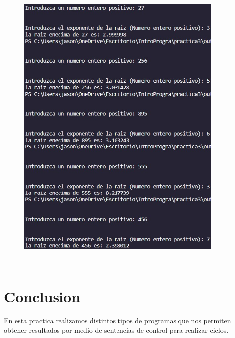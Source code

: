 \documentclass{article}
\begin{document}
\begin{figure}[H]
    \centering
    \includegraphics[width = 10cm]{img10.jpg}
\end{figure}

\
\
\
\

\section{Conclusion}

En esta practica realizamos distintos tipos de programas que nos permiten obtener resultados por medio de sentencias de control para realizar ciclos.
\end{document}
